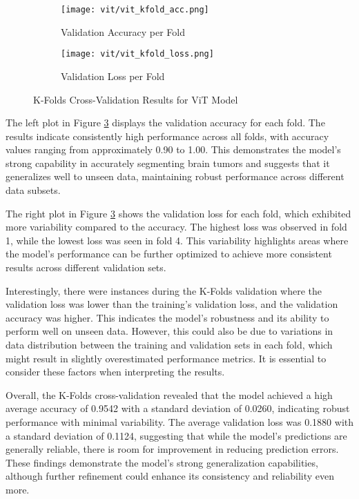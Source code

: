 \begin{figure}[H]
  \centering
  \begin{subfigure}[b]{0.45\textwidth}
    \centering
    \texttt{[image: vit/vit\_kfold\_acc.png]}
    \caption{Validation Accuracy per Fold}
    \label{fig:vit_accuracy}
  \end{subfigure}
  \hfill
  \begin{subfigure}[b]{0.45\textwidth}
    \centering
    \texttt{[image: vit/vit\_kfold\_loss.png]}
    \caption{Validation Loss per Fold}
    \label{fig:vit_loss}
  \end{subfigure}
  \caption{K-Folds Cross-Validation Results for ViT Model}
  \label{fig:vit_kfolds}
\end{figure}

The left plot in Figure \ref{fig:vit_kfolds} displays the validation accuracy for each fold. The results indicate consistently high performance across all folds, with accuracy values ranging from approximately 0.90 to 1.00. This demonstrates the model's strong capability in accurately segmenting brain tumors and suggests that it generalizes well to unseen data, maintaining robust performance across different data subsets.

The right plot in Figure \ref{fig:vit_kfolds} shows the validation loss for each fold, which exhibited more variability compared to the accuracy. The highest loss was observed in fold 1, while the lowest loss was seen in fold 4. This variability highlights areas where the model's performance can be further optimized to achieve more consistent results across different validation sets.

Interestingly, there were instances during the K-Folds validation where the validation loss was lower than the training's validation loss, and the validation accuracy was higher. This indicates the model's robustness and its ability to perform well on unseen data. However, this could also be due to variations in data distribution between the training and validation sets in each fold, which might result in slightly overestimated performance metrics. It is essential to consider these factors when interpreting the results.

Overall, the K-Folds cross-validation revealed that the model achieved a high average accuracy of 0.9542 with a standard deviation of 0.0260, indicating robust performance with minimal variability. The average validation loss was 0.1880 with a standard deviation of 0.1124, suggesting that while the model's predictions are generally reliable, there is room for improvement in reducing prediction errors. These findings demonstrate the model's strong generalization capabilities, although further refinement could enhance its consistency and reliability even more.


